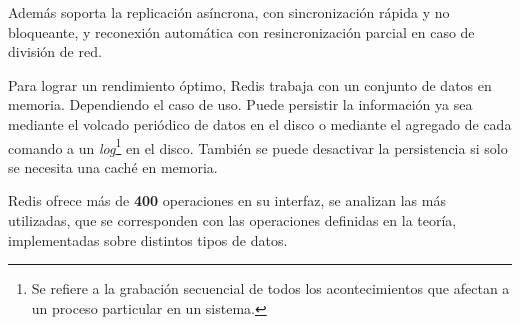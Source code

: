 \documentclass[pdflatex,sn-mathphys-num]{sn-jnl}
\theoremstyle{thmstyleone}%
\theoremstyle{thmstyletwo}%
\theoremstyle{thmstylethree}%
\begin{document}
Además soporta la replicación asíncrona, con sincronización rápida y no bloqueante, y reconexión automática con resincronización parcial en caso de división de red.

Para lograr un rendimiento óptimo, Redis trabaja con un conjunto de datos en memoria. Dependiendo el caso de uso. Puede persistir la información ya sea mediante el volcado periódico de datos en el disco o mediante el agregado de cada comando a un \textit{log}\footnote{Se refiere a la grabación secuencial de todos los acontecimientos que afectan a un proceso particular en un sistema.} en el disco. También se puede desactivar la persistencia si solo se necesita una caché en memoria.

Redis ofrece más de \textbf{400} operaciones en su interfaz, se analizan las más utilizadas, que se corresponden con las operaciones definidas en la teoría, implementadas sobre distintos tipos de datos.
\end{document}
